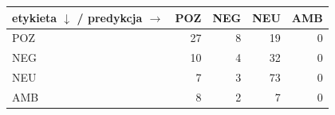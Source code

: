\begin{tabular}{lrrrr}
\toprule
etykieta $\downarrow$ / predykcja $\rightarrow$ & POZ & NEG & NEU & AMB \\
\midrule
POZ & 27 & 8 & 19 & 0 \\
NEG & 10 & 4 & 32 & 0 \\
NEU & 7 & 3 & 73 & 0 \\
AMB & 8 & 2 & 7 & 0 \\
\bottomrule
\end{tabular}
